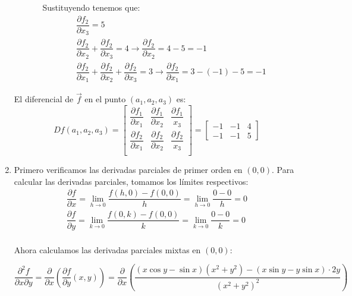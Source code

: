 \begin{enumerate}[label=\c olor{red}\textbf{\arabic*)}, leftmargin=*]
\begin{itemize}
\begin{enumerate}[label=\arabic*)]
	Sustituyendo tenemos que: \[ \begin{array}{l}
		\dfrac{\partial f_2}{\partial x_3}=5\\
		\dfrac{\partial f_2}{\partial x_2}+\dfrac{\partial f_2}{\partial x_3}=4\longrightarrow \dfrac{\partial f_2}{\partial x_2}=4-5=-1\\
		\dfrac{\partial f_2}{\partial x_1}+\dfrac{\partial f_2}{\partial x_2}+\dfrac{\partial f_2}{\partial x_3}=3\longrightarrow \dfrac{\partial f_2}{\partial x_1}=3-(-1)-5=-1
		\end{array} \]
\end{enumerate}
\end{itemize}
El diferencial de $\vec{f}$ en el punto $(a_1,a_2,a_3)$ es: \[ Df(a_1,a_2,a_3)=\begin{bmatrix}
\dfrac{\partial f_1}{\partial x_1} & \dfrac{\partial f_1}{\partial x_2} & \dfrac{\partial f_1}{x_3}\\
\dfrac{\partial f_2}{\partial x_1} & \dfrac{\partial f_2}{\partial x_2} & \dfrac{\partial f_2}{x_3}\\
\end{bmatrix}=\begin{bmatrix}
-1 & -1 & 4 \\
-1 & -1 & 5
\end{bmatrix} \]

\item {}

Primero verificamos las derivadas parciales de primer orden en $(0,0)$. Para calcular las derivadas parciales, tomamos los límites respectivos: \[ \begin{array}{l}
\dfrac{\partial f}{\partial x}=\lim_{h\to 0}\dfrac{f(h,0)-f(0,0)}{h}=\lim_{h\to0}\dfrac{0-0}{h}=0\\
\dfrac{\partial f}{\partial y}=\lim_{k\to 0}\dfrac{f(0,k)-f(0,0)}{k}=\lim_{k\to0}\dfrac{0-0}{k}=0\\
\end{array} \]

Ahora calculamos las derivadas parciales mixtas en $(0,0)$:

$\dfrac{\partial^2 f}{\partial x\partial y}=\dfrac{\partial}{\partial x}\left(\dfrac{\partial f}{\partial y}(x,y)\right)=\dfrac{\partial }{\partial x}\left(\dfrac{(x\cos y-\sin x)(x^2+y^2)-(x\sin y-y\sin x)\cdot 2y}{(x^2+y^2)^2}\right)$


\end{enumerate}
